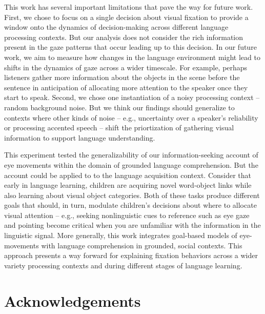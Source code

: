 \documentclass[10pt, letterpaper]{article}
\begin{document}
This work has several important limitations that pave the way for future
work. First, we chose to focus on a single decision about visual
fixation to provide a window onto the dynamics of decision-making across
different language processing contexts. But our analysis does not
consider the rich information present in the gaze patterns that occur
leading up to this decision. In our future work, we aim to measure how
changes in the language environment might lead to shifts in the dynamics
of gaze across a wider timescale. For example, perhaps listeners gather
more information about the objects in the scene before the sentence in
anticipation of allocating more attention to the speaker once they start
to speak. Second, we chose one instantiation of a noisy processing
context -- random background noise. But we think our findings should
generalize to contexts where other kinds of noise -- e.g., uncertainty
over a speaker's reliability or processing accented speech -- shift the
priortization of gathering visual information to support language
understanding.

This experiment tested the generalizability of our information-seeking
account of eye movements within the domain of grounded language
comprehension. But the account could be applied to to the language
acquisition context. Consider that early in language learning, children
are acquiring novel word-object links while also learning about visual
object categories. Both of these tasks produce different goals that
should, in turn, modulate children's decisions about where to allocate
visual attention -- e.g., seeking nonlinguistic cues to reference such
as eye gaze and pointing become critical when you are unfamiliar with
the information in the linguistic signal. More generally, this work
integrates goal-based models of eye-movements with language
comprehension in grounded, social contexts. This approach presents a way
forward for explaining fixation behaviors across a wider variety
processing contexts and during different stages of language learning.

\vspace{1em}
\vspace{1em}

\section{Acknowledgements}\label{acknowledgements}
\end{document}

